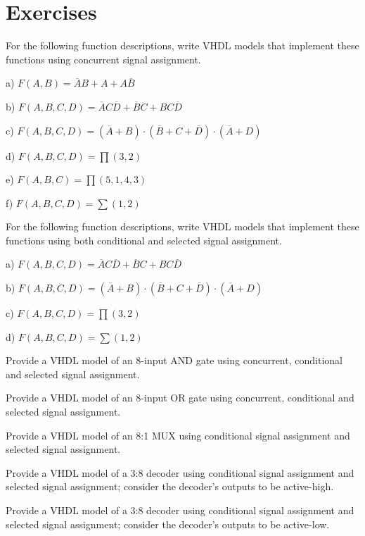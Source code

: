 \section{Exercises}
\begin{my_num_list}
\item For the following function descriptions, write VHDL models that implement these functions using concurrent signal assignment.

a) $F(A,B) =\overline{A}B +A +A\overline{B}$

b) $F(A,B,C,D) =\overline{A}C\overline{D} +\overline{B}C +BC\overline{D}$

c) $F(A,B,C,D) =(\overline{A}+B)\cdot(\overline{B}+C+\overline{D})\cdot(\overline{A}+D)$

d) $F(A,B,C,D) = \displaystyle\prod(3,2) $

e) $F(A,B,C) = \displaystyle\prod(5,1,4,3) $

f) $F(A,B,C,D) = \displaystyle\sum(1,2) $

\item For the following function descriptions, write VHDL models that implement these functions using both conditional and selected signal assignment.

a) $F(A,B,C,D) =\overline{A}C\overline{D} +\overline{B}C +BC\overline{D}$

b) $F(A,B,C,D) =(\overline{A}+B)\cdot(\overline{B}+C+\overline{D})\cdot(\overline{A}+D)$

c) $F(A,B,C,D) = \displaystyle\prod(3,2) $

d) $F(A,B,C,D) = \displaystyle\sum(1,2) $

\item Provide a VHDL model of an 8-input AND gate using concurrent, conditional and selected signal assignment.
\item Provide a VHDL model of an 8-input OR gate using concurrent, conditional and selected signal assignment.
\item Provide a VHDL model of an 8:1 MUX using conditional signal assignment and selected signal assignment.
\item Provide a VHDL model of a 3:8 decoder using conditional signal assignment and selected signal assignment; consider the decoder’s outputs to be active-high.
\item Provide a VHDL model of a 3:8 decoder using conditional signal assignment and selected signal assignment; consider the decoder’s outputs to be active-low.
\end{my_num_list}
